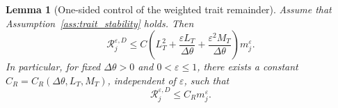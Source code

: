 \documentclass[11pt, dina4, amsfont12]{article}
\newtheorem{lemma}{Lemma}[section]
\begin{document}
\begin{lemma}[One-sided control of the weighted trait remainder]
\label{lem:one_sided_remainder_bound}
Assume that Assumption~\ref{ass:trait_stability} holds. Then
\begin{equation}\label{eq:one_sided_remainder_bound}
    \mathcal R_j^{\varepsilon,D}
    \le
    C
    \left(
        L_T^2
        +
        \frac{\varepsilon L_T}{\Delta\theta}
        +
        \frac{\varepsilon^2M_T}{\Delta\theta}
    \right)
    m_j^\varepsilon .
\end{equation}
In particular, for fixed \(\Delta\theta>0\) and \(0<\varepsilon\le1\), there
exists a constant \(C_R=C_R(\Delta\theta,L_T,M_T)\), independent of
\(\varepsilon\), such that
\begin{equation}\label{eq:remainder_CR_bound}
    \mathcal R_j^{\varepsilon,D}
    \le
    C_R m_j^\varepsilon .
\end{equation}
\end{lemma}
\end{document}
